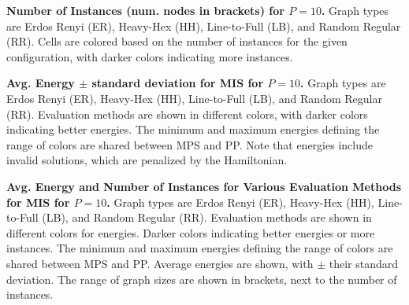 \begin{table}[H]
    \centering
    
    \caption{\textbf{Number of Instances (num. nodes in brackets) for $P=10$.} Graph types are Erdos Renyi (ER), Heavy-Hex (HH), Line-to-Full (LB), and Random Regular (RR). Cells are colored based on the number of instances for the given configuration, with darker colors indicating more instances.}
\end{table}
\clearpage
\begin{table}[H]
    \centering
    
    \caption{\textbf{Avg. Energy $\pm$ standard deviation for MIS for $P=10$.} Graph types are Erdos Renyi (ER), Heavy-Hex (HH), Line-to-Full (LB), and Random Regular (RR). Evaluation methods are shown in different colors, with darker colors indicating better energies. The minimum and maximum energies defining the range of colors are shared between MPS and PP. Note that energies include invalid solutions, which are penalized by the Hamiltonian.}
\end{table}
\clearpage
\begin{table}[H]
    \centering
    
    \caption{\textbf{Avg. Energy and Number of Instances for Various Evaluation Methods for MIS for $P=10$.} Graph types are Erdos Renyi (ER), Heavy-Hex (HH), Line-to-Full (LB), and Random Regular (RR). Evaluation methods are shown in different colors for energies. Darker colors indicating better energies or more instances. The minimum and maximum energies defining the range of colors are shared between MPS and PP. Average energies are shown, with $\pm$ their standard deviation. The range of graph sizes are shown in brackets, next to the number of instances.}
\end{table}
\clearpage